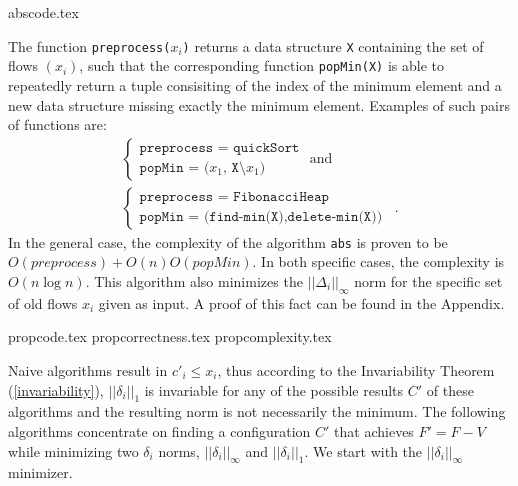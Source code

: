   {abscode.tex}

  The function \texttt{preprocess(}$x_i$\texttt{)} returns a data structure \texttt{X} containing the set of flows
  $\left(x_i\right)$, such that the corresponding function \texttt{popMin(X)} is able to repeatedly return a tuple
  consisiting of the index of the minimum element and a new data structure missing exactly the minimum element.
  Examples of such pairs of functions are:
  \begin{equation*}
  \begin{gathered}
    \begin{cases}
      \texttt{preprocess = quickSort} \\
      \texttt{popMin = (}x_1\texttt{, X}\setminus x_1\texttt{)}
    \end{cases}
    \mbox{ and} \\
    \begin{cases}
      \texttt{preprocess = FibonacciHeap} \\
      \texttt{popMin = (find-min(X),delete-min(X))}
    \end{cases} \enspace.
  \end{gathered}
  \end{equation*}
  In the general case, the complexity of the algorithm \texttt{abs} is proven to be $O\left(preprocess\right) + O\left(n\right)O\left(popMin\right)$.
  In both specific cases, the complexity is $O\left(n\log{n}\right)$. This algorithm also minimizes the $||\Delta_i||_\infty$
  norm for the specific set of old flows $x_i$ given as input. A proof of this fact can be found in the Appendix.

  {propcode.tex}
  {propcorrectness.tex}
  {propcomplexity.tex}

  Naive algorithms result in $c'_i \leq x_i$, thus according to the Invariability Theorem (\ref{invariability}),
  $||\delta_i||_1$ is invariable for any of the possible results $C'$ of these algorithms and the resulting norm is not
  necessarily the minimum. The following algorithms concentrate on finding a configuration $C'$ that achieves $F' = F - V$
  while minimizing two $\delta_i$ norms, $||\delta_i||_\infty$ and $||\delta_i||_1$. We start with the
  $||\delta_i||_\infty$ minimizer.

